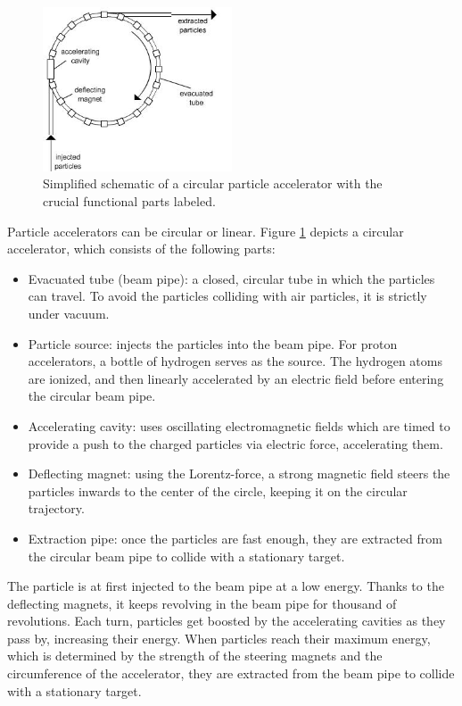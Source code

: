 \documentclass[12pt]{article}
\begin{document}
\begin{figure}[H]
	\begin{center}
		\includegraphics[width=0.5\textwidth]{particle_accelerator_schematic}
	\end{center}
	\caption{Simplified schematic of a circular particle accelerator with the crucial functional parts labeled. \cite{accelerator_image_src_1}}
	\label{fig_part_accel_schematic}
\end{figure}

Particle accelerators can be circular or linear. Figure \ref{fig_part_accel_schematic} depicts a circular accelerator, which consists of the following parts:
\begin{itemize}
	\item Evacuated tube (beam pipe): a closed, circular tube in which the particles can travel. To avoid the particles colliding with air particles, it is strictly under vacuum.
	\item Particle source: injects the particles into the beam pipe. For proton accelerators, a bottle of hydrogen serves as the source. The hydrogen atoms are ionized, and then linearly accelerated by an electric field before entering the circular beam pipe.
	\item Accelerating cavity: uses oscillating electromagnetic fields which are timed to provide a push to the charged particles via electric force, accelerating them.
	\item Deflecting magnet: using the Lorentz-force, a strong magnetic field steers the particles inwards to the center of the circle, keeping it on the circular trajectory.
	\item Extraction pipe: once the particles are fast enough, they are extracted from the circular beam pipe to collide with a stationary target.
\end{itemize}

The particle is at first injected to the beam pipe at a low energy. Thanks to the deflecting magnets, it keeps revolving in the beam pipe for thousand of revolutions. Each turn, particles get boosted by the accelerating cavities as they pass by, increasing their energy. When particles reach their maximum energy, which is determined by the strength of the steering magnets and the circumference of the accelerator, they are extracted from the beam pipe to collide with a stationary target.
\end{document}
